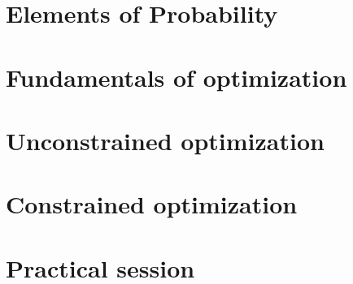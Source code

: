 \documentclass[letterpaper,10pt,english]{jupyterBook}
\begin{document}
\sphinxstepscope


\chapter{Elements of Probability}
\label{\detokenize{05.probability:elements-of-probability}}\label{\detokenize{05.probability::doc}}

\sphinxstepscope


\chapter{Fundamentals of optimization}
\label{\detokenize{06.optimization_fundamentals:fundamentals-of-optimization}}\label{\detokenize{06.optimization_fundamentals::doc}}

\sphinxstepscope


\chapter{Unconstrained optimization}
\label{\detokenize{07.unconstrained:unconstrained-optimization}}\label{\detokenize{07.unconstrained::doc}}

\sphinxstepscope


\chapter{Constrained optimization}
\label{\detokenize{08.constrained:constrained-optimization}}\label{\detokenize{08.constrained::doc}}

\sphinxstepscope


\chapter{Practical session}
\label{\detokenize{09.practical_session:practical-session}}\label{\detokenize{09.practical_session::doc}}
\end{document}
